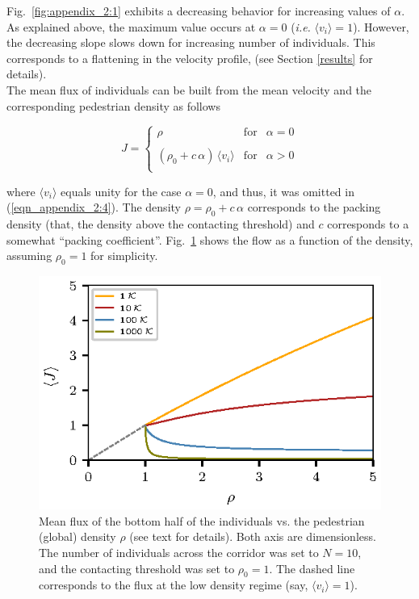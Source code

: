 Fig.~\ref{fig:appendix_2:1} exhibits a decreasing behavior for increasing 
values 
of $\alpha$. As explained above, the maximum value occurs at $\alpha=0$ 
(\textit{i.e.} $\langle v_i\rangle=1$). However, the decreasing slope slows 
down for increasing number of individuals. This corresponds to a flattening in 
the velocity profile, (see Section \ref{results} for details).  \\

The mean flux of individuals can be built from the mean velocity and the 
corresponding pedestrian density as follows

\begin{equation}
 J=\left\{\begin{array}{lcl}
          \rho & \mathrm{for} & \alpha=0 \\
          & & \\
          (\rho_0+c\,\alpha)\,\langle v_i\rangle & \mathrm{for}  & 
\alpha>0\\
         \end{array}\right.\label{eqn_appendix_2:4}
\end{equation}

where $\langle v_i\rangle$ equals unity for the case $\alpha=0$, and thus, it 
was omitted in (\ref{eqn_appendix_2:4}). The density $\rho=\rho_0+c\,\alpha$ 
corresponds to the packing density (that, the density above the contacting 
threshold) and $c$ corresponds to a somewhat ``packing coefficient''. 
Fig.~\ref{fig:appendix_2:2} shows the flow as a function of the density, 
assuming $\rho_0=1$ for simplicity. \\


\begin{figure}[htbp!]
\includegraphics[width=\columnwidth]
{./plots/fig_flux_model.eps}
\caption{\label{fig:appendix_2:2} Mean flux of the bottom half of the 
individuals vs. the pedestrian (global) density $\rho$ (see text for 
details). Both axis are dimensionless. The number of individuals across the 
corridor was set to $N=10$, and the contacting threshold was set to $\rho_0=1$. 
The dashed line corresponds to the flux at the low density regime (say, 
$\langle 
v_i\rangle=1$).   }
\end{figure}


